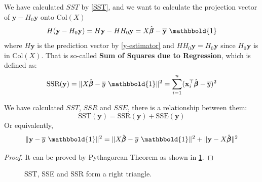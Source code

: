     We have calculated $SST$ by \cref{SST}, and we want to calculate the projection vector of $\mathbf{y} - H_0\mathbf{y}$ onto $\text{Col}(X)$
    \begin{equation*}
        H(\mathbf{y} - H_0\mathbf{y}) = H\mathbf{y} - HH_0\mathbf{y} = X\hat{\pmb{\beta}} - \overline{\mathbf{y}}\ \mathbbold{1}
    \end{equation*}
    where $H\mathbf{y}$ is the prediction vector by \cref{y-estimator} and $HH_0\mathbf{y} = H_0\mathbf{y}$ since $H_0\mathbf{y}$ is in $\text{Col}(X)$.
    That is so-called \textbf{Sum of Squares due to Regression}, which is defined as:
    \begin{equation} \label{SSR}
        \text{SSR}(\mathbf{y}) = \lVert X\hat{\pmb{\beta}} - \overline{y}\ \mathbbold{1} \rVert^2 = \sum_{i = 1}^n (\mathbf{x}_i^{\top}\hat{\pmb{\beta}} - \overline{y})^2
    \end{equation}
\begin{Thm}
    We have calculated $SST$, $SSR$ and $SSE$, there is a relationship between them:
    \begin{equation}
        \text{SST}(\mathbf{y}) = \text{SSR}(\mathbf{y}) + \text{SSE}(\mathbf{y})
    \end{equation}
    Or equivalently,
    \begin{equation}\label{7-10}
        \lVert \mathbf{y} - \overline{y}\ \mathbbold{1} \rVert^2 = \lVert X\hat{\pmb{\beta}} - \overline{y}\ \mathbbold{1} \rVert^2 + \lVert \mathbf{y} - X\hat{\pmb{\beta}} \rVert^2
    \end{equation}

    \begin{proof}
        It can be proved by Pythagorean Theorem as shown in \cref{SST-SSE-SSR}.
    \end{proof}
\end{Thm}
\begin{figure}
    \centering
    
    \caption{SST, SSE and SSR form a right triangle.}
    \label{SST-SSE-SSR}
\end{figure}
